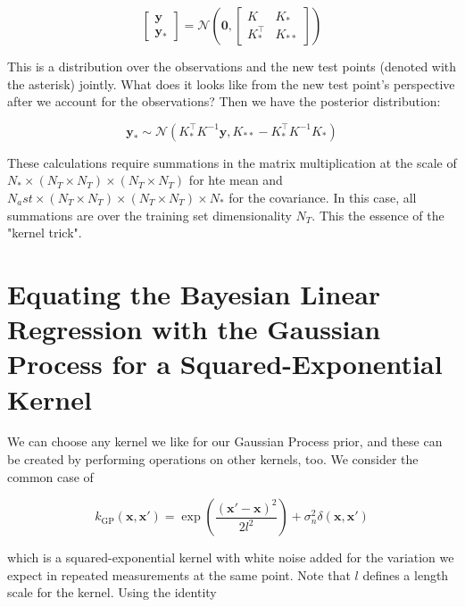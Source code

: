 \documentclass{article}
\begin{document}
\begin{equation}
    \begin{bmatrix}
    \mathbf{y} \\
    \mathbf{y_\ast}
    \end{bmatrix} =
    \mathcal{N}\left(\mathbf{0},
    \begin{bmatrix}
    K & K_\ast \\
    K^\top_\ast & K_{\ast\ast}
    \end{bmatrix}\right)
\end{equation} 

This is a distribution over the observations and the new test points (denoted with the asterisk) jointly. What does it looks like from the new test point's perspective after we account for the observations?  Then we have the posterior distribution:

\begin{equation}
\label{GP_posterior}
\mathbf{y}_\ast\sim\mathcal{N}\left(K_\ast^\top K^{-1}\mathbf{y},K_{\ast\ast}-K_\ast^\top K^{-1}K_\ast \right)
\end{equation}

These calculations require summations in the matrix multiplication at the scale of $N_\ast \times (N_T \times N_T) \times (N_T \times N_T)$ for hte mean and $N_ast \times (N_T \times N_T) \times (N_T \times N_T) \times N_\ast$ for the covariance. In this case, all summations are over the training set dimensionality $N_T$. This the essence of the "kernel trick".

\section{Equating the Bayesian Linear Regression with the Gaussian Process for a Squared-Exponential Kernel}

We can choose any kernel we like for our Gaussian Process prior, and these can be created by performing operations on other kernels, too. We consider the common case of 

\begin{equation}
\label{kernel}
    k_\text{GP}(\mathbf{x},\mathbf{x}') = \exp\left(\frac{(\mathbf{x}'-\mathbf{x})^2}{2l^2}\right) + \sigma_n^2 \delta(\mathbf{x}, \mathbf{x}')
\end{equation}

which is a squared-exponential kernel with white noise added for the variation we expect in repeated measurements at the same point. Note that $l$ defines a length scale for the kernel.
Using the identity 
\end{document}
